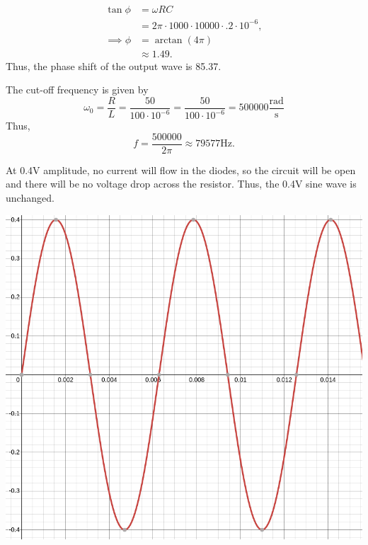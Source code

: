 \documentclass{article}
\begin{document}
\begin{align*}
    \tan\phi &= \omega RC \\
             &= 2\pi\cdot1000\cdot10000\cdot.2\cdot10^{-6}, \\
    \implies \phi &= \arctan(4\pi) \\
                  &\approx 1.49.
\end{align*}
Thus, the phase shift of the output wave is 85.37\degree.

\newpage{}

The cut-off frequency is given by $$\omega_0 = \frac RL = \frac{50}{100\cdot10^{-6}} = \frac{50}{100\cdot10^{-6}} = 500000 \frac{\text{rad}}{\text{s}}$$
Thus, $$f = \frac{500000}{2\pi} \approx 79577\text{Hz}.$$

\newpage{}

At 0.4V amplitude, no current will flow in the diodes, so the circuit will be open and there will be no voltage drop across the resistor. Thus, the 0.4V sine wave is unchanged.
\begin{center}
\includegraphics[scale=.3]{plot1.png}
\end{center}
\end{document}
